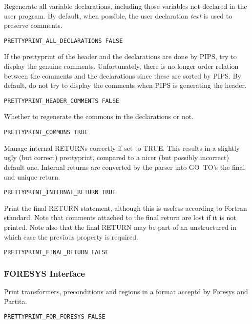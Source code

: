 Regenerate all variable declarations, including those variables not
declared in the user program. By default, when possible, the user
declaration {\em text} is used to preserve comments.

\begin{verbatim}
PRETTYPRINT_ALL_DECLARATIONS FALSE
\end{verbatim}

If the prettyprint of the header and the declarations are done by
PIPS, try to display the genuine comments. Unfortunately, there is no
longer order relation between the comments and the declarations since
these are sorted by PIPS. By default, do not try to display the
comments when PIPS is generating the header.
\begin{verbatim}
PRETTYPRINT_HEADER_COMMENTS FALSE
\end{verbatim}

Whether to regenerate the commons in the declarations or not.

\begin{verbatim}
PRETTYPRINT_COMMONS TRUE
\end{verbatim}

Manage internal RETURNs correctly if set to TRUE.  This results in a
slightly ugly (but correct) prettyprint, compared to a nicer (but
possibly incorrect) default one. Internal returns are converted by the
parser into GO~TO's the final and unique return.

\begin{verbatim}
PRETTYPRINT_INTERNAL_RETURN TRUE
\end{verbatim}

Print the final RETURN statement, although this is useless according to
Fortran standard. Note that comments attached to the final return are
lost if it is not printed. Note also that the final RETURN may be part
of an unstructured in which case the previous property is required.

\begin{verbatim}
PRETTYPRINT_FINAL_RETURN FALSE
\end{verbatim}

\subsubsection{FORESYS Interface}

Print transformers, preconditions and regions in a format acceptd by
Foresys and Partita.

\begin{verbatim}
PRETTYPRINT_FOR_FORESYS FALSE
\end{verbatim}

